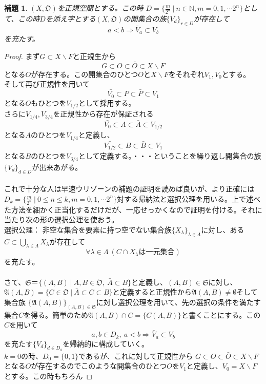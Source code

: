 \documentclass{jsarticle}
\newtheorem{lemma}[theorem]{補題}
\begin{document}
\begin{lemma}
$(X,\mathfrak{O})$を正規空間とする。この時
$\displaystyle D=\{\frac{m}{2^{n}}\ |\ n\in\mathbb{N},m=0,1,\cdots 2^{n}\}$として、この時$D$を添え字とする$(X,\mathfrak{O})$の開集合の族$\{V_{d}\}_{r\in D}$が存在して
\[
a<b\Rightarrow \bar{V}_a\subset V_b
\]を充たす。
\end{lemma}
\begin{proof}
まず$G\subset X\backslash F$と正規生から
\[
G\subset O\subset \bar{O} \subset X\backslash F
\]となる$O$が存在する。この開集合のひとつ$O$と$X\backslash F$をそれぞれ$V_{1},V_{0}$とする。\\ 
そして再び正規性を用いて
\[
\bar{V_{0}}\subset P\subset \bar{P} \subset V_{1}
\]
となる$O$もひとつを$V_{1/2}$として採用する。\\ 
さらに$V_{1/4},V_{3/4}$を正規性から存在が保証される
\[
\bar{V_{0}}\subset A\subset \bar{A} \subset V_{1/2}
\]
となる$A$のひとつを$V_{1/4}$と定義し、
\[
\bar{V_{1/2}}\subset B\subset \bar{B} \subset V_{1}
\]
となる$B$のひとつを$V_{3/4}$として定義する。・・・ということを繰り返し開集合の族$\{V_{d}\}_{d\in D}$が出来あがる。\\ \\ 
これで十分な人は早速ウリゾーンの補題の証明を読めば良いが、より正確には
$\displaystyle D_k=\{\frac{m}{2^{n}}\ |\ 0\le n\le k,m=0,1,\cdots 2^{n}\}$対する帰納法と選択公理を用いる。上で述べた方法を細かく正当化するだけだが、一応せっかくなので証明を付ける。それに当たり次の形の選択公理を使おう。\\ 
選択公理：
非空な集合を要素に持つ空でない集合族$\{X_{\lambda}\}_{\lambda\in \Lambda}$に対し、ある$C\subset \bigcup_{\lambda\in \Lambda}X_{\lambda}$が存在して 
\[\forall\lambda\in \Lambda\ (C\cap X_{\lambda}は一元集合)
\]を充たす。\\　\\ 
さて、$\mathfrak{S}＝\{(A,B)\ |\ A,B\in \mathfrak{O},\ \bar{A}\subset B\}$と定義し、$(A,B)\in \mathfrak{S}$に対し、
$\mathfrak{A}(A,B)=\{C\in \mathfrak{O}\ |\ \bar{A}\subset C\subset B\}$と定義すると正規性から$\mathfrak{A}(A,B)\neq \emptyset$そして集合族
$\{\mathfrak{A}(A,B)\}_{(A,B)\in \mathfrak{S}}$に対し選択公理を用いて、先の選択の条件を満たす集合$C$を得る。簡単のため$\mathfrak{A}(A,B)\cap C=\{C(A,B)\}$と書くことにする。この$C$を用いて
\[
a,b\in D_{k},\ a<b\Rightarrow \bar{V}_a\subset V_b
\]
を充たす$\{V_{d}\}_{d\in D_k}$を帰納的に構成していく。\\ 
$k=0$の時、$D_{0}=\{0,1\}$であるが、これに対して正規性から
$G\subset O\subset \bar{O} \subset X\backslash F$となる$O$が存在するのでこのような開集合のひとつ$O$を$V_1$と定義し、$V_0=X\backslash F$とする。この時もちろん

\end{proof}
\end{document}
